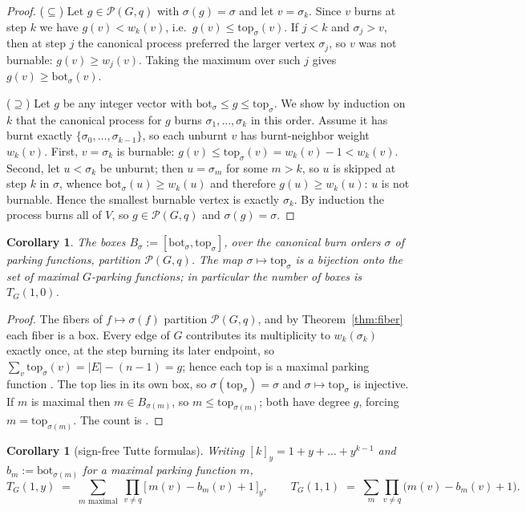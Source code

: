 \documentclass[11pt]{amsart}
\newtheorem{corollary}[theorem]{Corollary}
\theoremstyle{definition}
\newcommand{\PF}{\mathcal{P}}
\newcommand{\bott}[1]{\mathrm{bot}_{#1}}
\newcommand{\topp}[1]{\mathrm{top}_{#1}}
\begin{document}
\begin{proof}
($\subseteq$) Let $g\in\PF(G,q)$ with $\sigma(g)=\sigma$ and let
$v=\sigma_k$. Since $v$ burns at step $k$ we have $g(v) < w_k(v)$, i.e.\
$g(v)\le\topp{\sigma}(v)$. If $j<k$ and $\sigma_j > v$, then at step $j$ the
canonical process preferred the larger vertex $\sigma_j$, so $v$ was not
burnable: $g(v) \ge w_j(v)$. Taking the maximum over such $j$ gives
$g(v)\ge\bott{\sigma}(v)$.

($\supseteq$) Let $g$ be any integer vector with
$\bott{\sigma}\le g\le\topp{\sigma}$. We show by induction on $k$ that the
canonical process for $g$ burns $\sigma_1,\dots,\sigma_{k}$ in this order.
Assume it has burnt exactly $\{\sigma_0,\dots,\sigma_{k-1}\}$, so each
unburnt $v$ has burnt-neighbor weight $w_k(v)$. First, $v=\sigma_k$ is
burnable: $g(v) \le \topp{\sigma}(v) = w_k(v)-1 < w_k(v)$. Second, let
$u < \sigma_k$ be unburnt; then $u = \sigma_m$ for some $m > k$, so $u$ is
skipped at step $k$ in $\sigma$, whence
$\bott{\sigma}(u) \ge w_k(u)$ and therefore $g(u) \ge w_k(u)$: $u$ is not
burnable. Hence the smallest burnable vertex is exactly $\sigma_k$. By
induction the process burns all of $V$, so $g \in \PF(G,q)$ and
$\sigma(g)=\sigma$.
\end{proof}

\begin{corollary}\label{cor:partition}
The boxes $B_\sigma := [\bott{\sigma},\topp{\sigma}]$, over the canonical burn
orders $\sigma$ of parking functions, partition $\PF(G,q)$. The map
$\sigma \mapsto \topp{\sigma}$ is a bijection onto the set of maximal
$G$-parking functions; in particular the number of boxes is $T_G(1,0)$.
\end{corollary}

\begin{proof}
The fibers of $f \mapsto \sigma(f)$ partition $\PF(G,q)$, and by
Theorem~\ref{thm:fiber} each fiber is a box. Every edge of $G$ contributes
its multiplicity to $w_k(\sigma_k)$ exactly once, at the step burning its
later endpoint, so
$\sum_v \topp{\sigma}(v) = |E| - (n-1) = g$; hence each top is a maximal
parking function \cite[Prop.~2.3, Cor.~3.2]{bct}. The top lies in its own
box, so $\sigma(\topp{\sigma})=\sigma$ and $\sigma\mapsto\topp{\sigma}$ is
injective. If $m$ is maximal then $m \in B_{\sigma(m)}$, so
$m \le \topp{\sigma(m)}$; both have degree $g$, forcing
$m=\topp{\sigma(m)}$. The count is \cite[Thm.~4.1]{bct}.
\end{proof}

\begin{corollary}[sign-free Tutte formulas]\label{cor:tutte}
Writing $[k]_y = 1+y+\dots+y^{k-1}$ and $b_m := \bott{\sigma(m)}$ for a
maximal parking function $m$,
\[
  T_G(1,y) \;=\; \sum_{m \text{ maximal}} \ \prod_{v \ne q}
      \bigl[\, m(v) - b_m(v) + 1 \,\bigr]_y ,
  \qquad
  T_G(1,1) \;=\; \sum_{m} \prod_{v\ne q} \bigl(m(v)-b_m(v)+1\bigr).
\]
\end{corollary}
\end{document}
